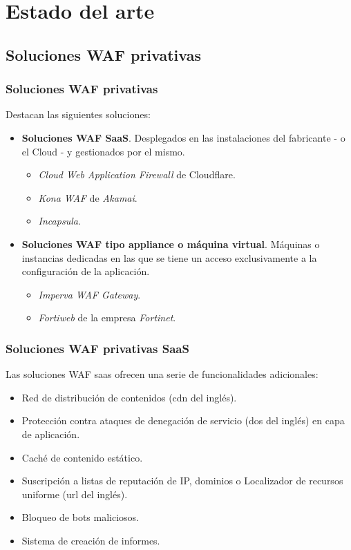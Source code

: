 \section{Estado del arte}

\subsection{Soluciones WAF privativas}
\begin{frame}[shrink]
  \frametitle{Soluciones WAF privativas}
  Destacan las siguientes soluciones:
  \begin{itemize}
    \item {\bf Soluciones WAF SaaS}. Desplegados en las instalaciones del fabricante - o el Cloud - y gestionados por el mismo.
      \begin{itemize}
        \item {\em Cloud Web Application Firewall} \cite{cloudflarewaf} de Cloudflare\cite{cloudflare}.
        \item {\em Kona WAF\cite{kona}} de {\em Akamai\cite{akamai}}.
        \item {\em Incapsula\cite{Incapsula}}.
      \end{itemize}
    \item {\bf Soluciones WAF tipo appliance o máquina virtual}. Máquinas o instancias dedicadas en las que se tiene un acceso exclusivamente a la configuración de la aplicación.
      \begin{itemize}
        \item {\em Imperva WAF Gateway\cite{imperva}}.
        \item {\em Fortiweb\cite{fortiweb}} de la empresa {\em Fortinet\cite{fortinet}}.
      \end{itemize}
  \end{itemize}
\end{frame}

\begin{frame}[shrink]
  \frametitle{Soluciones WAF privativas SaaS}
  Las soluciones WAF \acrshort{saas} ofrecen una serie de funcionalidades adicionales:
  \begin{itemize}
    \item Red de distribución de contenidos (\acrlong{cdn} del inglés).
    \item Protección contra ataques de denegación de servicio (\acrshort{dos} del inglés) en capa de aplicación.
    \item Caché de contenido estático.
    \item Suscripción a listas de reputación de IP, dominios o Localizador de recursos uniforme (\acrshort{url} del inglés).
    \item Bloqueo de bots maliciosos.
    \item Sistema de creación de informes.
  \end{itemize}
\end{frame}

